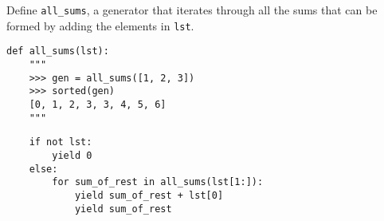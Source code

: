 \begin{blocksection}
\question Define \lstinline$all_sums$, a generator that iterates through all the sums that can be formed by adding the elements in \lstinline$lst$.
\begin{lstlisting}
def all_sums(lst):
    """
    >>> gen = all_sums([1, 2, 3])
    >>> sorted(gen)
    [0, 1, 2, 3, 3, 4, 5, 6]
    """
\end{lstlisting}

\begin{solution}[1.5in]
\begin{lstlisting}
    if not lst:
        yield 0
    else:
        for sum_of_rest in all_sums(lst[1:]):
            yield sum_of_rest + lst[0]
            yield sum_of_rest
\end{lstlisting}
\end{solution}
\end{blocksection}
